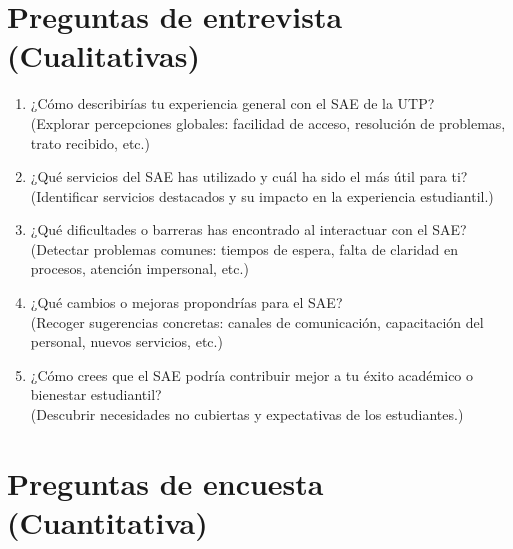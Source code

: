 \documentclass{article}
\begin{document}
\section*{Preguntas de entrevista (Cualitativas)}
\begin{enumerate}
  \item ¿Cómo describirías tu experiencia general con el SAE de la UTP? \\
  (Explorar percepciones globales: facilidad de acceso, resolución de problemas, trato recibido, etc.)

  \item ¿Qué servicios del SAE has utilizado y cuál ha sido el más útil para ti? \\
  (Identificar servicios destacados y su impacto en la experiencia estudiantil.)

  \item ¿Qué dificultades o barreras has encontrado al interactuar con el SAE? \\
  (Detectar problemas comunes: tiempos de espera, falta de claridad en procesos, atención impersonal, etc.)

  \item ¿Qué cambios o mejoras propondrías para el SAE? \\
  (Recoger sugerencias concretas: canales de comunicación, capacitación del personal, nuevos servicios, etc.)

  \item ¿Cómo crees que el SAE podría contribuir mejor a tu éxito académico o bienestar estudiantil? \\
  (Descubrir necesidades no cubiertas y expectativas de los estudiantes.)
\end{enumerate}

\section*{Preguntas de encuesta (Cuantitativa)}
\end{document}
